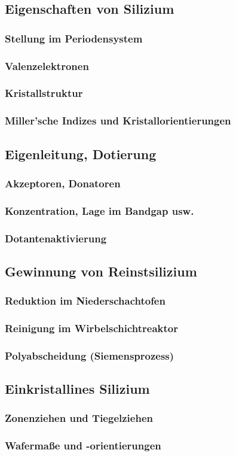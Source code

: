 \subsection{Eigenschaften von Silizium}
	\subsubsection{Stellung im Periodensystem}
	\subsubsection{Valenzelektronen}
	\subsubsection{Kristallstruktur}
	\subsubsection{Miller'sche Indizes und Kristallorientierungen}
\subsection{Eigenleitung, Dotierung}
	\subsubsection{Akzeptoren, Donatoren }
	\subsubsection{Konzentration, Lage im Bandgap usw.}
	\subsubsection{Dotantenaktivierung}
\subsection{Gewinnung von Reinstsilizium}
	\subsubsection{Reduktion im Niederschachtofen}
	\subsubsection{Reinigung im Wirbelschichtreaktor}
	\subsubsection{Polyabscheidung (Siemensprozess)}
\subsection{Einkristallines Silizium}
	\subsubsection{Zonenziehen und Tiegelziehen}
	\subsubsection{Wafermaße und -orientierungen}

